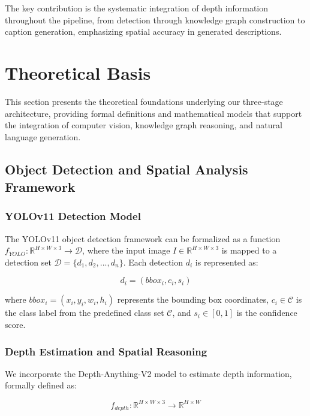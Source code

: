\documentclass[runningheads,14pt]{llncs}
\begin{document}
The key contribution is the systematic integration of depth information throughout the pipeline, from detection through knowledge graph construction to caption generation, emphasizing spatial accuracy in generated descriptions.



\section{Theoretical Basis}

This section presents the theoretical foundations underlying our three-stage architecture, providing formal definitions and mathematical models that support the integration of computer vision, knowledge graph reasoning, and natural language generation.

\subsection{Object Detection and Spatial Analysis Framework}

\subsubsection{YOLOv11 Detection Model}
The YOLOv11 object detection framework can be formalized as a function $f_{YOLO}: \mathbb{R}^{H \times W \times 3} \rightarrow \mathcal{D}$, where the input image $I \in \mathbb{R}^{H \times W \times 3}$ is mapped to a detection set $\mathcal{D} = \{d_1, d_2, ..., d_n\}$. Each detection $d_i$ is represented as:

\begin{equation}
d_i = (bbox_i, c_i, s_i)
\end{equation}

where $bbox_i = (x_i, y_i, w_i, h_i)$ represents the bounding box coordinates, $c_i \in \mathcal{C}$ is the class label from the predefined class set $\mathcal{C}$, and $s_i \in [0,1]$ is the confidence score.

\subsubsection{Depth Estimation and Spatial Reasoning}
We incorporate the Depth-Anything-V2 model \cite{yang2024depth} to estimate depth information, formally defined as:

\begin{equation}
f_{depth}: \mathbb{R}^{H \times W \times 3} \rightarrow \mathbb{R}^{H \times W}
\end{equation}
\end{document}
